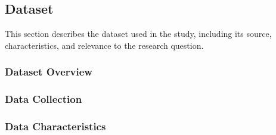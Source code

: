 \subsection{Dataset}
\label{subsec:dataset}

This section describes the dataset used in the study, including its source, characteristics, and relevance to the research question.


\subsubsection{Dataset Overview}

\subsubsection{Data Collection}

\subsubsection{Data Characteristics}



